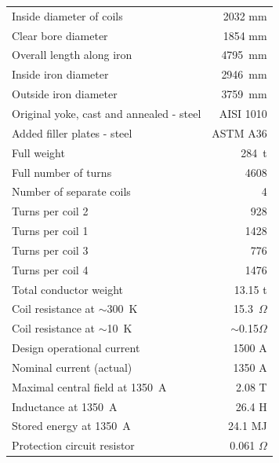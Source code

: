 \begin{table}[thp]
 \begin{center}
   \small
   \begin{tabular}{lr}
     \hline
     \hline
       Inside diameter of coils        & 2032 mm \\
       Clear bore diameter             & 1854 mm \\
       Overall length along iron       & 4795~mm \\
       Inside iron diameter            & 2946~mm \\
       Outside iron diameter           & 3759~mm \\
       Original yoke, cast and annealed - steel & AISI 1010 \\
       Added filler plates - steel     & ASTM A36 \\
       Full weight                     & 284~t      \\
       Full number of turns            & 4608 \\
       Number of separate coils        & 4 \\
       Turns per coil 2                &  928 \\   
       Turns per coil 1                & 1428 \\   
       Turns per coil 3                &  776 \\   
       Turns per coil 4                & 1476 \\   
       Total conductor weight          & 13.15 t \\
       Coil resistance at $\sim$300~K & 15.3~$\Omega$ \\   
       Coil resistance at  $\sim$10~K & $\sim$0.15$\Omega$ \\   
       Design operational current      & 1500 A \\
       Nominal current (actual)        & 1350 A \\
       Maximal central field at 1350~A & 2.08 T \\   
       Inductance at 1350~A            & 26.4 H \\
       Stored energy at 1350~A         & 24.1 MJ  \\
       Protection circuit resistor     & 0.061 $\Omega$  \\

\end{tabular}
\end{center}
\end{table}
